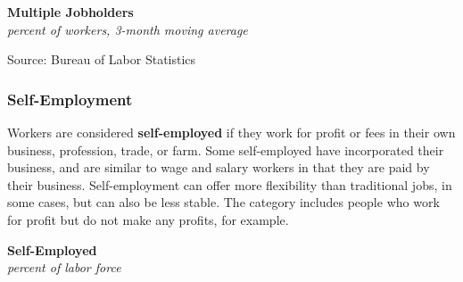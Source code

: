 \documentclass{report}
\makeatletter
\newcommand{\tbllink}[1]{\href{https://raw.githubusercontent.com/bdecon/US-chartbook/master/chartbook/data/#1}{\faTable}}
\newcommand*\short[1]{\expandafter\@gobbletwo\number\numexpr#1\relax}
\newcommand{\absnode}[3]{\node[below right, align=left] at (axis cs: #1,#2) {#3};}
\newcommand{\shdateaxisticks}{
		date coordinates in=x, axis line style={draw=none},
		xmax={2023-11-30},
		max space between ticks=40,	    
		xtick={{1990-01-01}, {1995-01-01}, {2000-01-01}, 
			{2005-01-01}, {2010-01-01}, {2015-01-01}, {2020-01-01}},
		minor xtick={},
		enlarge y limits={0.06}, enlarge x limits={0.01},
		xticklabel style={align=center, yshift=-2pt}, tick label style={inner sep=0pt},
		}
\newcommand{\bbar}[2]{extra #1 ticks = {{#2}}, extra #1 tick labels = ,
		extra #1 tick style = {grid=major, grid style={thick, black!25}},}
\newcommand{\stdline}[4]{\addplot[very thick, no markers, color=#1] 
		table [x=#2, y=#3, col sep=comma] {#4};	}
\newcommand{\rbars}{
		\fill[color=black!10] (axis cs:{1990-07-01},\pgfkeysvalueof{/pgfplots/ymin}) rectangle 
			(axis cs:{1991-03-01}, \pgfkeysvalueof{/pgfplots/ymax});
		\fill[color=black!10] (axis cs:{2007-12-01},\pgfkeysvalueof{/pgfplots/ymin}) rectangle 
			(axis cs:{2009-07-01}, \pgfkeysvalueof{/pgfplots/ymax});
		\fill[color=black!10] (axis cs:{2001-03-01},\pgfkeysvalueof{/pgfplots/ymin}) rectangle 
			(axis cs:{2001-11-01}, \pgfkeysvalueof{/pgfplots/ymax});
		\fill[color=black!10] (axis cs:{2020-02-01},\pgfkeysvalueof{/pgfplots/ymin}) rectangle 
			(axis cs:{2020-05-01}, \pgfkeysvalueof{/pgfplots/ymax});}
\newcommand{\rebars}{
		\fill[color=black!10] (axis cs:{2007-12-01},\pgfkeysvalueof{/pgfplots/ymin}) rectangle 
			(axis cs:{2009-07-01}, \pgfkeysvalueof{/pgfplots/ymax});
		\fill[color=black!10] (axis cs:{2001-03-01},\pgfkeysvalueof{/pgfplots/ymin}) rectangle 
			(axis cs:{2001-11-01}, \pgfkeysvalueof{/pgfplots/ymax});
		\fill[color=black!10] (axis cs:{2020-02-01},\pgfkeysvalueof{/pgfplots/ymin}) rectangle 
			(axis cs:{2020-05-01}, \pgfkeysvalueof{/pgfplots/ymax});}
\makeatother
\begin{document}
{\begin{minipage}{0.42\textwidth}
\normalsize \textbf{Multiple Jobholders}\\
\footnotesize{\textit{percent of workers, 3-month moving average}}
\vspace{2.8cm}

\hspace{2mm} 

\footnotesize{Source: Bureau of Labor Statistics} \hfill \tbllink{mjh.csv} \ \
\end{minipage} \hspace{5mm}
\begin{minipage}{0.3\textwidth}
\small 
\end{minipage}
\newpage
\begin{minipage}{0.76\textwidth}
\subsubsection*{Self-Employment}
\small Workers are considered \textbf{self-employed} if they work for profit or fees in their own business, profession, trade, or farm. Some self-employed have incorporated their business, and are similar to wage and salary workers in that they are paid by their business. Self-employment can offer more flexibility than traditional jobs, in some cases, but can also be less stable. The category includes people who work for profit but do not make any profits, for example. 


\end{minipage}

\begin{minipage}{0.475\textwidth}
\normalsize \textbf{Self-Employed}\\
\footnotesize{\textit{percent of labor force}}
\vspace{3.6cm}

\hspace{2mm} 


\end{minipage}}
\end{document}
